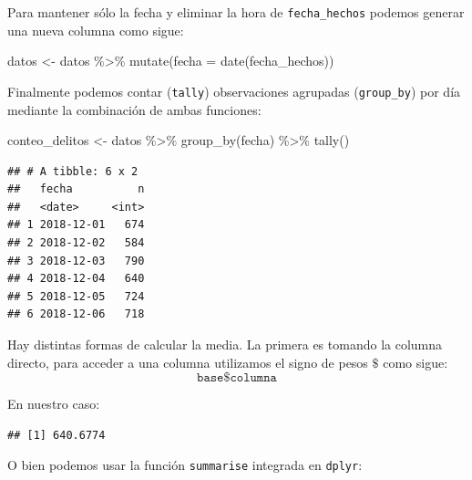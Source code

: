 \documentclass[
]{book}
\newenvironment{Shaded}{\begin{snugshade}}{\end{snugshade}}
\newcommand{\AttributeTok}[1]{\textcolor[rgb]{0.77,0.63,0.00}{#1}}
\newcommand{\FunctionTok}[1]{\textcolor[rgb]{0.00,0.00,0.00}{#1}}
\newcommand{\NormalTok}[1]{#1}
\newcommand{\OtherTok}[1]{\textcolor[rgb]{0.56,0.35,0.01}{#1}}
\newcommand{\SpecialCharTok}[1]{\textcolor[rgb]{0.00,0.00,0.00}{#1}}
\begin{document}
Para mantener sólo la fecha y eliminar la hora de \texttt{fecha\_hechos} podemos generar una nueva columna como sigue:

\begin{Shaded}
\begin{Highlighting}[]
\NormalTok{datos }\OtherTok{\textless{}{-}}\NormalTok{ datos }\SpecialCharTok{\%\textgreater{}\%} \FunctionTok{mutate}\NormalTok{(}\AttributeTok{fecha =} \FunctionTok{date}\NormalTok{(fecha\_hechos))}
\end{Highlighting}
\end{Shaded}

Finalmente podemos contar (\texttt{tally}) observaciones agrupadas (\texttt{group\_by}) por día mediante la combinación de ambas funciones:

\begin{Shaded}
\begin{Highlighting}[]
\NormalTok{conteo\_delitos }\OtherTok{\textless{}{-}}\NormalTok{ datos }\SpecialCharTok{\%\textgreater{}\%} \FunctionTok{group\_by}\NormalTok{(fecha) }\SpecialCharTok{\%\textgreater{}\%} \FunctionTok{tally}\NormalTok{()}
\end{Highlighting}
\end{Shaded}

\begin{verbatim}
## # A tibble: 6 x 2
##   fecha          n
##   <date>     <int>
## 1 2018-12-01   674
## 2 2018-12-02   584
## 3 2018-12-03   790
## 4 2018-12-04   640
## 5 2018-12-05   724
## 6 2018-12-06   718
\end{verbatim}

Hay distintas formas de calcular la media. La primera es tomando la columna directo, para acceder a una columna utilizamos el signo de pesos \(\$\) como sigue:
\[
\texttt{base} \texttt{\$} \texttt{columna}
\]

En nuestro caso:

\begin{Shaded}
\end{Shaded}

\begin{verbatim}
## [1] 640.6774
\end{verbatim}

O bien podemos usar la función \texttt{summarise} integrada en \texttt{dplyr}:
\end{document}
